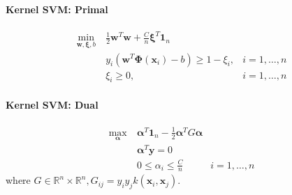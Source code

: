 \documentclass{article}[11pt]
\begin{document}
\paragraph{Kernel SVM: Primal}
\begin{align*}
  \min_{\mathbf{w}, \boldsymbol{\xi}, b} ~& \frac{1}{2} \mathbf{w}^T\mathbf{w} + \frac{C}{n} \boldsymbol{\xi}^T\mathbf{1}_n & \\
  & y_i(\mathbf{w}^T \boldsymbol{\Phi}(\mathbf{x}_i) - b) \ge 1 - \xi_i,& i = 1, \dots, n \\
  & \xi_i \ge 0,& i = 1, \dots, n
\end{align*}

\paragraph{Kernel SVM: Dual}
\begin{align*}
  \max_{\boldsymbol{\alpha}} ~& \boldsymbol{\alpha}^T \mathbf{1}_n - \frac{1}{2} \boldsymbol{\alpha}^T G \boldsymbol{\alpha} & \\
  & \boldsymbol{\alpha}^T \mathbf{y} = 0 & \\
  & 0 \le \alpha_i \le \frac{C}{n} & i = 1, \dots, n
\end{align*}
where $G \in \mathbb{R}^n \times \mathbb{R}^n, G_{ij} = y_i y_j k(\mathbf{x}_i, \mathbf{x}_j)$.
\end{document}
